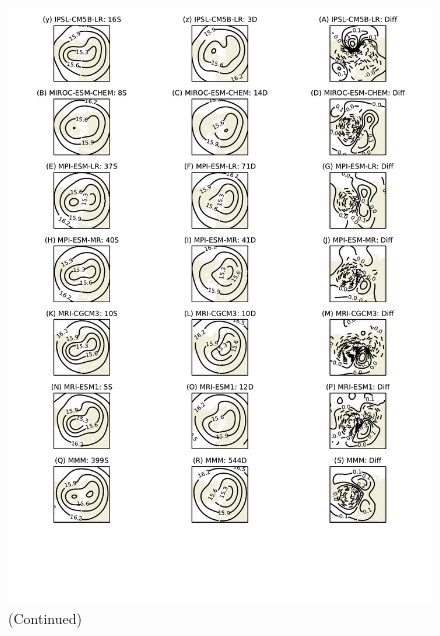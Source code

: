 \begin{figure}
 \ContinuedFloat
 \centering
 \noindent\includegraphics[width=\textwidth]{figures/chapter-models/100hPa_GPH2.pdf}
 \caption[]{(Continued)}
\end{figure}


